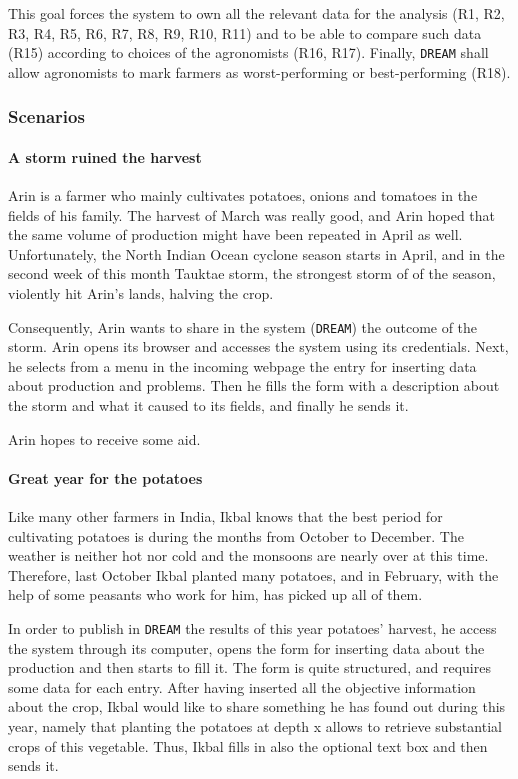 \documentclass{article}
\begin{document}
This goal forces the system to own all the relevant data for the analysis (R1, R2, R3, R4, R5, R6, R7, R8, R9, R10, R11) and to be able to compare such data (R15) according to choices of the agronomists (R16, R17). Finally, \verb|DREAM| shall allow agronomists to mark farmers as worst-performing or best-performing (R18).
\subsubsection{Scenarios}
\paragraph{A storm ruined the harvest}
Arin is a farmer who mainly cultivates potatoes, onions and tomatoes in the fields of his family. The harvest of March was really good, and Arin hoped that the same volume of production might have been repeated in April as well. Unfortunately, the North Indian Ocean cyclone season starts in April, and in the second week of this month Tauktae storm, the strongest storm of of the season, violently hit Arin's lands, halving the crop.\par
\noindent Consequently, Arin wants to share in the system (\verb|DREAM|) the outcome of the storm. Arin opens its browser and accesses the system using its credentials. Next, he selects from a menu in the incoming webpage the entry for inserting data about production and problems. Then he fills the form with a description about the storm and what it caused to its fields, and finally he sends it.\par
\noindent Arin hopes to receive some aid.
\paragraph{Great year for the potatoes}
Like many other farmers in India, Ikbal knows that the best period for cultivating potatoes is during the months from October to December. The weather is neither hot nor cold and the monsoons are nearly over at this time. Therefore, last October Ikbal planted many potatoes, and in February, with the help of some peasants who work for him, has picked up all of them. \par
\noindent In order to publish in \verb|DREAM| the results of this year potatoes' harvest, he access the system through its computer, opens the form for inserting data about the production and then starts to fill it. The form is quite structured, and requires some data for each entry. After having inserted all the objective information about the crop, Ikbal would like to share something he has found out during this year, namely that planting the potatoes at depth x allows to retrieve substantial crops of this vegetable. Thus, Ikbal fills in also the optional text box and then sends it.
\end{document}
